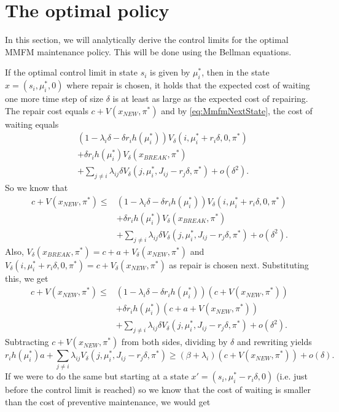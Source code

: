 \section{The optimal policy}
In this section, we will analytically derive the control limits for the optimal MMFM maintenance policy.
This will be done using the Bellman equations.

If the optimal control limit in state $s_i$ is given by $\mu_i^*$, then in the state $x=(s_i,\mu_i^*,0)$ where repair is chosen, it holds that the expected cost of waiting one more time step of size $\delta$ is at least as large as the expected cost of repairing.
The repair cost equals $c+V(x_{NEW},\pi^*)$ and by \eqref{eq:MmfmNextState}, the cost of waiting equals
\[
\begin{split}
&(1-\lambda_i \delta-\delta r_ih(\mu_i^*))V_\delta(i,\mu_i^*+r_i\delta,0,\pi^*)\\
&+ \delta r_ih(\mu_i^*)V_\delta(x_{BREAK},\pi^*)\\
&+\sum\limits_{j\neq i}\lambda_{ij} \delta V_\delta(j,\mu_i^*,J_{ij}-r_j\delta,\pi^*)+o(\delta^2).
\end{split}
\]
So we know that
\[
\begin{split}
c+V(x_{NEW},\pi^*)\leq 
&(1-\lambda_i \delta-\delta r_ih(\mu_i^*))V_\delta(i,\mu_i^*+r_i\delta,0,\pi^*)\\
&+ \delta r_ih(\mu_i^*)V_\delta(x_{BREAK},\pi^*)\\
&+\sum\limits_{j\neq i}\lambda_{ij} \delta V_\delta(j,\mu_i^*,J_{ij}-r_j\delta,\pi^*)+o(\delta^2).
\end{split}
\]
Also, $V_\delta(x_{BREAK},\pi^*)=c+a+V_\delta(x_{NEW},\pi^*)$ and $V_\delta(i,\mu_i^*+r_i\delta,0,\pi^*)=c+V_\delta(x_{NEW},\pi^*)$ as repair is chosen next.
Substituting this, we get
\[\begin{split}
c+V(x_{NEW},\pi^*)\leq
&(1-\lambda_i \delta-\delta r_ih(\mu_i^*))(c+V(x_{NEW},\pi^*))\\
&+ \delta r_ih(\mu_i^*)(c+a+V(x_{NEW},\pi^*))\\
&+\sum\limits_{j\neq i}\lambda_{ij} \delta V_\delta(j,\mu_i^*,J_{ij}-r_j\delta,\pi^*)+o(\delta^2).
\end{split}
\]
Subtracting $c+V(x_{NEW},\pi^*)$ from both sides, dividing by $\delta$ and rewriting yields
\[
r_ih(\mu_i^*)a+\sum\limits_{j\neq i}\lambda_{ij} V_\delta(j,\mu_i^*,J_{ij}-r_j\delta,\pi^*)\geq
(\beta+\lambda_i)(c+V(x_{NEW},\pi^*))+o(\delta).
\]
If we were to do the same but starting at a state $x'=(s_i,\mu_i^*-r_i\delta,0)$ (i.e. just before the control limit is reached) so we know that the cost of waiting is smaller than the cost of preventive maintenance, we would get
